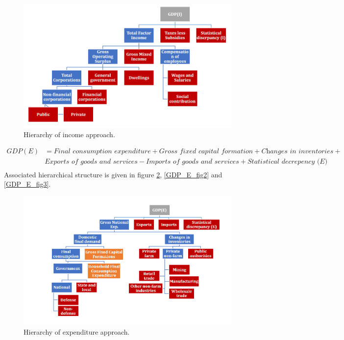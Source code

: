 \documentclass[graybox]{svmult}
\begin{document}
\begin{figure}[H]
	\centering
	\small
	\includegraphics[scale=0.65]{Figs/GDP_I_fig1.PNG}
	\caption{Hierarchy of income approach.}\label{GDP_I_fig1}
\end{figure}

\begin{align*}
GDP(E) &= \textit{Final consumption expenditure} + \textit{Gross fixed capital formation} + \textit{Changes in inventories} +\\ &\textit{Exports of goods and services} - \textit{Imports of goods and services} + \textit{Statistical decrepency (E)}\\
\end{align*}
Associated hierarchical structure is given in figure \ref{GDP_E_fig1}, \ref{GDP_E_fig2} and \ref{GDP_E_fig3}.

\begin{figure}[H]
	\centering
	\small
	\includegraphics[scale=0.65]{Figs/GDP_E_fig1.PNG}
	\caption{Hierarchy of expenditure approach.}\label{GDP_E_fig1}
\end{figure}
\end{document}
